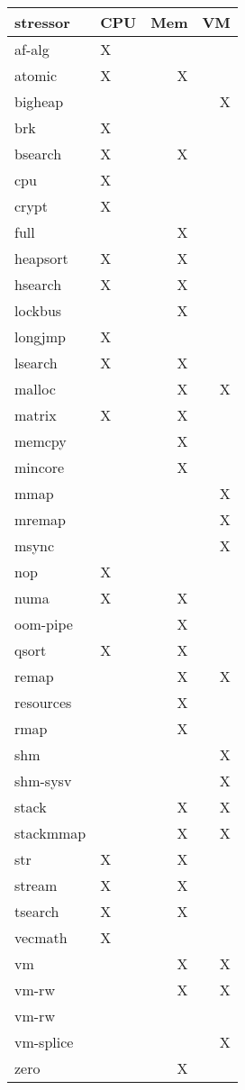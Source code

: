 \begin{tabular}{llrr}
\toprule
stressor & CPU & Mem & VM \\
\midrule
af-alg   & X   &     & \\
atomic   & X   & X   & \\
bigheap  &     &     & X \\
brk      & X   &     & \\
bsearch  & X   & X   & \\
cpu      & X   &     & \\
crypt  &  X   &     &  \\
full  &     &  X   &  \\
heapsort  &  X   & X    &  \\
hsearch  &  X   &  X   &  \\
lockbus  &     &  X   &  \\
longjmp  &  X   &     &  \\
lsearch  &  X   &  X   &  \\
malloc  &     &  X   & X \\
matrix  &  X   &  X   &  \\
memcpy  &     &  X   &  \\
mincore  &     &  X   &  \\
mmap  &     &     & X \\
mremap  &     &     & X \\
msync  &     &     & X \\
nop  &   X  &     &  \\
numa  &  X   &  X   &  \\
oom-pipe  &     &  X   &  \\
qsort  &  X   &  X   &  \\
remap  &     &  X   & X \\
resources  &     &  X   &  \\
rmap  &     &   X  &  \\
shm  &     &     & X \\
shm-sysv  &     &     & X \\
stack  &     &  X   & X \\
stackmmap  &     &  X   & X \\
str  &  X   &  X   &  \\
stream  &  X   & X    &  \\
tsearch  & X    & X    &  \\
vecmath  &  X   &     &  \\
vm  &     &  X   & X \\
vm-rw  &     &  X   & X \\
vm-rw  &     &     &  \\
vm-splice  &     &     & X \\
zero  &     & X    &  \\
\bottomrule
\end{tabular}
